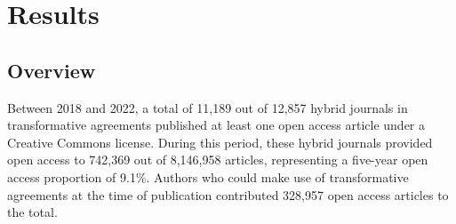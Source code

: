 \documentclass[a4paper,man,floatsintext,longtable,noextraspace,12pt]{apa6}
\begin{document}
\hypertarget{results}{%
\section{Results}\label{results}}

\hypertarget{overview}{%
\subsection{Overview}\label{overview}}

Between 2018 and 2022, a total of 11,189 out of 12,857 hybrid journals
in transformative agreements published at least one open access article
under a Creative Commons license. During this period, these hybrid
journals provided open access to 742,369 out of 8,146,958 articles,
representing a five-year open access proportion of 9.1\%. Authors who
could make use of transformative agreements at the time of publication
contributed 328,957 open access articles to the total.
\end{document}
